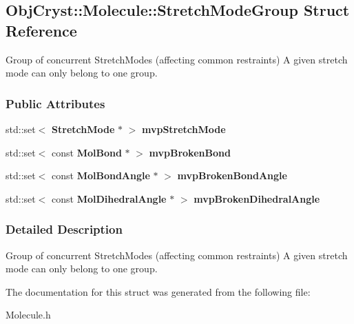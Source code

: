 \subsection{ObjCryst::Molecule::StretchModeGroup Struct Reference}
\label{a00099}


Group of concurrent StretchModes (affecting common restraints) A given stretch mode can only belong to one group.  
\subsubsection*{Public Attributes}
\begin{DoxyCompactItemize}
\item 
std::set$<$ {\bf StretchMode} $\ast$ $>$ {\bfseries mvpStretchMode}\label{a00099_a63c54cd06ab4a7b838cc686214d41750}

\item 
std::set$<$ const {\bf MolBond} $\ast$ $>$ {\bfseries mvpBrokenBond}\label{a00099_a3f6e58dc0887b43c2187080b27e2836f}

\item 
std::set$<$ const {\bf MolBondAngle} $\ast$ $>$ {\bfseries mvpBrokenBondAngle}\label{a00099_a2b325fc86d71b14c62efc683e05b0fe0}

\item 
std::set$<$ const {\bf MolDihedralAngle} $\ast$ $>$ {\bfseries mvpBrokenDihedralAngle}\label{a00099_aaaee134991cbfe70408dc4b310981c63}

\end{DoxyCompactItemize}


\subsubsection{Detailed Description}
Group of concurrent StretchModes (affecting common restraints) A given stretch mode can only belong to one group. 

The documentation for this struct was generated from the following file:\begin{DoxyCompactItemize}
\item 
Molecule.h\end{DoxyCompactItemize}
